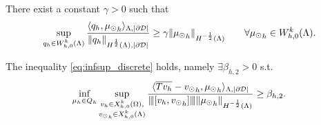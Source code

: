 \begin{lemma}\label{infsup_avr_trspace}
There exist a constant $\gamma >0$ such that
\begin{equation*}
\sup_{\substack{q_h \in W_{h,0}^k(\Lambda)}} \frac{\langle q_h , {\mu_{\odot}}_h \rangle_{\Lambda, |\partial\mathcal{D}|}}{ \|q_h\|_{H^{\frac 12}(\Lambda),|\partial\mathcal{D}|}} \geq \gamma \|{\mu_{\odot}}_h\|_{H^{-\frac 12}(\Lambda)} \qquad \forall {\mu_{\odot}}_h \in W_{h,0}^k(\Lambda).
\end{equation*} 
\end{lemma}

\begin{theorem} The inequality \eqref{eq:infsup_discrete} holds, namely 
$\exists \beta_{h,2} >0$ s.t.
\begin{equation}
\inf_{\mu_h \in Q_h} 
\sup_{\substack{v_h \in X_{h,0}^k(\Omega),\\ {v_{\odot}}_h \in X_{h,0}^k(\Lambda)} }\frac{\langle \overline{Tv_h} -  {v_{\odot}}_h, {\mu_{\odot}}_h \rangle _{\Lambda,|\partial\mathcal{D}|} } {{\left\vert\kern-0.25ex\left\vert\kern-0.25ex\left\vert [v_h, {v_{\odot}}_h] \right\vert\kern-0.25ex\right\vert\kern-0.25ex\right\vert} \|{\mu_{\odot}}_h\|_{H^{-\frac 12 }(\Lambda)} } 
\geq \beta_{h,2}. 
\end{equation}
\end{theorem}
